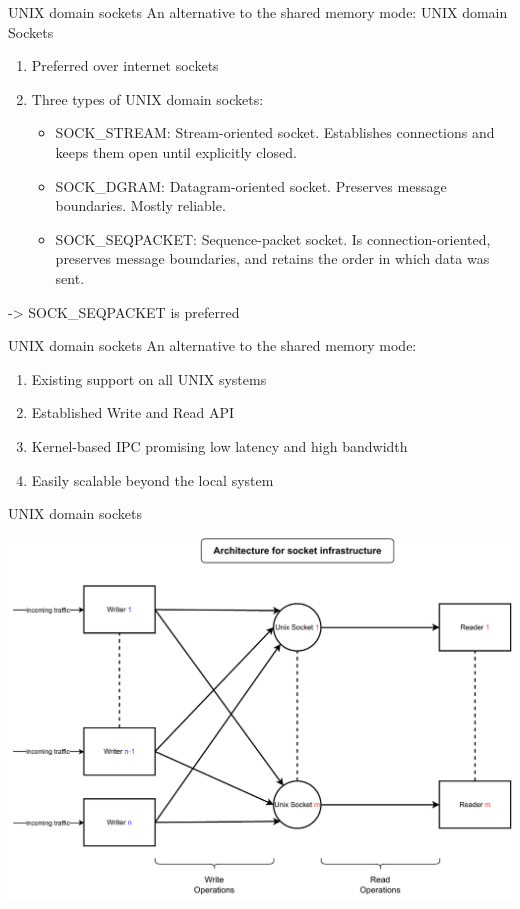 \documentclass[11pt,english,table,dvipsnames]{beamer}
\begin{document}
\begin{frame}{UNIX domain sockets}
    An alternative to the shared memory mode\@: UNIX domain Sockets
    \\
    \begin{enumerate}
        \item Preferred over internet sockets
        \item Three types of UNIX domain sockets\@:
            \begin{itemize}
                \item SOCK\_STREAM\@: Stream-oriented socket. Establishes connections and keeps them open until explicitly closed.
                \item SOCK\_DGRAM\@: Datagram-oriented socket. Preserves message boundaries. Mostly reliable.
                \item SOCK\_SEQPACKET\@: Sequence-packet socket. Is connection-oriented, preserves message boundaries, and retains the order in which data was sent.
            \end{itemize}
    \end{enumerate}
    \begin{block}{}
        -> SOCK\_SEQPACKET is preferred
    \end{block}
\end{frame}

\begin{frame}{UNIX domain sockets}
    An alternative to the shared memory mode\@:
    \begin{enumerate}
        \item Existing support on all UNIX systems
        \item Established Write and Read API
        \item Kernel-based IPC promising low latency and high bandwidth
        \item Easily scalable beyond the local system
    \end{enumerate}
\end{frame}

\begin{frame}{UNIX domain sockets}
    \begin{center}
        \includegraphics[width=0.8\linewidth]{images/SocketArchitecture.pdf}
    \end{center}
\end{frame}
\end{document}

